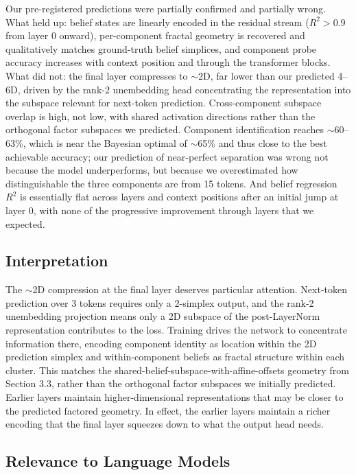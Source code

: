 \documentclass{article}
\begin{document}
Our pre-registered predictions were partially confirmed and partially wrong. What held up: belief states are linearly encoded in the residual stream ($R^2 > 0.9$ from layer 0 onward), per-component fractal geometry is recovered and qualitatively matches ground-truth belief simplices, and component probe accuracy increases with context position and through the transformer blocks. What did not: the final layer compresses to $\sim$2D, far lower than our predicted 4--6D, driven by the rank-2 unembedding head concentrating the representation into the subspace relevant for next-token prediction. Cross-component subspace overlap is high, not low, with shared activation directions rather than the orthogonal factor subspaces we predicted. Component identification reaches $\sim$60--63\%, which is near the Bayesian optimal of $\sim$65\% and thus close to the best achievable accuracy; our prediction of near-perfect separation was wrong not because the model underperforms, but because we overestimated how distinguishable the three components are from 15 tokens. And belief regression $R^2$ is essentially flat across layers and context positions after an initial jump at layer 0, with none of the progressive improvement through layers that we expected.

\subsection{Interpretation}

The $\sim$2D compression at the final layer deserves particular attention. Next-token prediction over 3 tokens requires only a 2-simplex output, and the rank-2 unembedding projection means only a 2D subspace of the post-LayerNorm representation contributes to the loss. Training drives the network to concentrate information there, encoding component identity as location within the 2D prediction simplex and within-component beliefs as fractal structure within each cluster. This matches the shared-belief-subspace-with-affine-offsets geometry from Section 3.3, rather than the orthogonal factor subspaces we initially predicted. Earlier layers maintain higher-dimensional representations that may be closer to the predicted factored geometry. In effect, the earlier layers maintain a richer encoding that the final layer squeezes down to what the output head needs.

\subsection{Relevance to Language Models}
\end{document}
